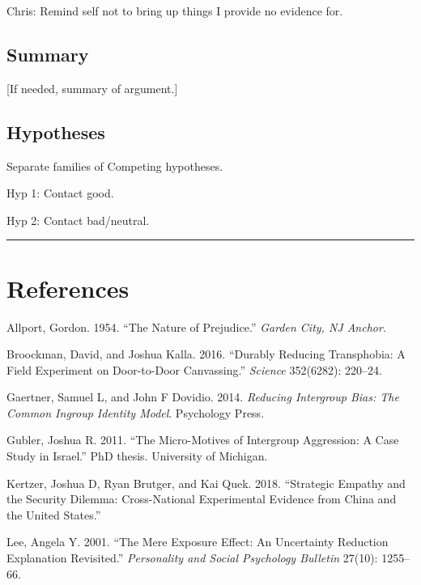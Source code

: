 \documentclass[11pt]{article}
\begin{document}
Chris: Remind self not to bring up things I provide no evidence for.

\hypertarget{summary}{%
\subsection{Summary}\label{summary}}

{[}If needed, summary of argument.{]}

\hypertarget{hypotheses}{%
\subsection{Hypotheses}\label{hypotheses}}

Separate families of Competing hypotheses.

Hyp 1: Contact good.

Hyp 2: Contact bad/neutral.

\begin{center}\rule{0.5\linewidth}{\linethickness}\end{center}

\hypertarget{references}{%
\section{References}\label{references}}

\hypertarget{refs}{}
\leavevmode\hypertarget{ref-allport1954prejudice}{}%
Allport, Gordon. 1954. ``The Nature of Prejudice.'' \emph{Garden City,
NJ Anchor}.

\leavevmode\hypertarget{ref-broockman2016durably}{}%
Broockman, David, and Joshua Kalla. 2016. ``Durably Reducing
Transphobia: A Field Experiment on Door-to-Door Canvassing.''
\emph{Science} 352(6282): 220--24.

\leavevmode\hypertarget{ref-gaertner2014reducing}{}%
Gaertner, Samuel L, and John F Dovidio. 2014. \emph{Reducing Intergroup
Bias: The Common Ingroup Identity Model}. Psychology Press.

\leavevmode\hypertarget{ref-gubler2011diss}{}%
Gubler, Joshua R. 2011. ``The Micro-Motives of Intergroup Aggression: A
Case Study in Israel.'' PhD thesis. University of Michigan.

\leavevmode\hypertarget{ref-kertzer2018empathy}{}%
Kertzer, Joshua D, Ryan Brutger, and Kai Quek. 2018. ``Strategic Empathy
and the Security Dilemma: Cross-National Experimental Evidence from
China and the United States.''

\leavevmode\hypertarget{ref-lee2001mere}{}%
Lee, Angela Y. 2001. ``The Mere Exposure Effect: An Uncertainty
Reduction Explanation Revisited.'' \emph{Personality and Social
Psychology Bulletin} 27(10): 1255--66.
\end{document}
